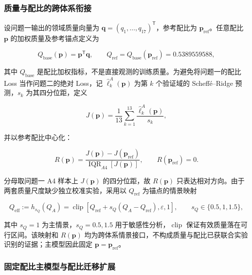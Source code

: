 \subsubsection{质量与配比的跨体系衔接}

设问题一输出的领域质量向量为 $\boldsymbol q=(q_1,\ldots,q_{17})^{\mathsf T}$，参考配比为 $\boldsymbol p_{\mathrm{ref}}$。任意配比 $\boldsymbol p$ 的加权质量及参考锚点定义为

\begin{equation}
Q_{\mathrm{base}}(\boldsymbol p)
=
\boldsymbol p^{\mathsf T}\boldsymbol q,
\qquad
Q_{\mathrm{ref}}
=
Q_{\mathrm{base}}(\boldsymbol p_{\mathrm{ref}})
=
0.5389559588,
\label{eq:p2_quality_bridge}
\end{equation}

其中 $Q_{\mathrm{base}}$ 是配比加权指标，不是直接观测的训练质量。为避免将问题一的配比 Loss 当作问题二的绝对 Loss，记 $\widehat{\ell}_k^A(\boldsymbol p)$ 为第 $k$ 个验证域的 Scheff\'e--Ridge 预测，$s_k$ 为其四分位距，定义

\begin{equation}
J(\boldsymbol p)
=
\frac{1}{13}
\sum_{k=1}^{13}
\frac{\widehat{\ell}_k^A(\boldsymbol p)}
{s_k},
\label{eq:p2_quality_bridge_J}
\end{equation}

并以参考配比中心化：

\begin{equation}
R(\boldsymbol p)
=
\frac{
J(\boldsymbol p)-J(\boldsymbol p_{\mathrm{ref}})
}
{
\operatorname{IQR}_{A4}[J(\boldsymbol p)]
},
\qquad
R(\boldsymbol p_{\mathrm{ref}})
=
0.
\label{eq:p2_mixture_bridge}
\end{equation}

分母取问题一 A4 样本上 $J(\boldsymbol p)$ 的四分位距，故 $R(\boldsymbol p)$ 只表达相对方向。由于两套质量尺度缺少独立校准实验，采用以 $Q_{\mathrm{ref}}$ 为锚点的情景映射

\begin{equation}
Q_{\mathrm{eff}}:=h_{s_Q}(Q_A)
=
\operatorname{clip}
\left[
Q_{\mathrm{ref}}
+
s_Q(Q_A-Q_{\mathrm{ref}}),
\varepsilon,
1
\right],
\qquad
s_Q\in\{0.5,1,1.5\},
\label{eq:p2_quality_map}
\end{equation}

其中 $s_Q=1$ 为主情景，$s_Q=0.5,1.5$ 用于敏感性分析，$\operatorname{clip}$ 保证有效质量落在可行区间。该映射和 $R(\boldsymbol p)$ 均为跨体系情景接口，不构成质量与配比已获联合实验识别的证据；主模型因此固定 $\boldsymbol p=\boldsymbol p_{\mathrm{ref}}$。

\subsubsection{固定配比主模型与配比迁移扩展}

